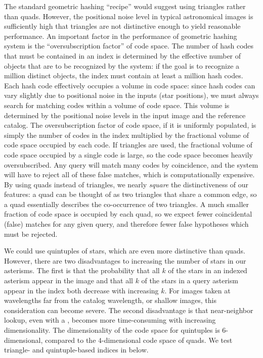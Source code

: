 The standard geometric hashing ``recipe'' would suggest using
triangles rather than quads.  However, the positional noise level in
typical astronomical images is sufficiently high that triangles are
not distinctive enough to yield reasonable performance.  An important
factor in the performance of geometric hashing system is the
``oversubscription factor'' of code space.  The number of hash codes
that must be contained in an index is determined by the effective
number of objects that are to be recognized by the system: if the goal
is to recognize a million distinct objects, the index must contain at
least a million hash codes.  Each hash code effectively occupies a
volume in code space: since hash codes can vary slightly due to
positional noise in the inputs (star positions), we must always search
for matching codes within a volume of code space.  This volume is
determined by the positional noise levels in the input image and the
reference catalog.  The oversubscription factor of code space, if it
is uniformly populated, is simply the number of codes in the index
multiplied by the fractional volume of code space occupied by each
code.  If triangles are used, the fractional volume of code space
occupied by a single code is large, so the code space becomes heavily
oversubscribed.  Any query will match many codes by coincidence, and
the system will have to reject all of these false matches, which is
computationally expensive.  By using quads instead of triangles, we
nearly \emph{square} the distinctiveness of our features: a quad can
be thought of as two triangles that share a common edge, so a quad
essentially describes the co-occurrence of two triangles.  A much
smaller fraction of code space is occupied by each quad, so we expect
fewer coincidental (false) matches for any given query, and therefore
fewer false hypotheses which must be rejected.


We could use quintuples of stars, which are even more distinctive than
quads.  However, there are two disadvantages to increasing the number
of stars in our asterisms.  The first is that the probability that all
$k$ of the stars in an indexed asterism appear in the image and that
all $k$ of the stars in a query asterism appear in the index both
decrease with increasing $k$.  For images taken at wavelengths far
from the catalog wavelength, or shallow images, this consideration can
become severe.  The second disadvantage is that near-neighbor lookup,
even with a \kdtree, becomes more time-consuming with increasing
dimensionality. The dimensionality of the code space for quintuples is
$6$-dimensional, compared to the $4$-dimensional code space of quads.
We test triangle- and quintuple-based indices in
 below.


